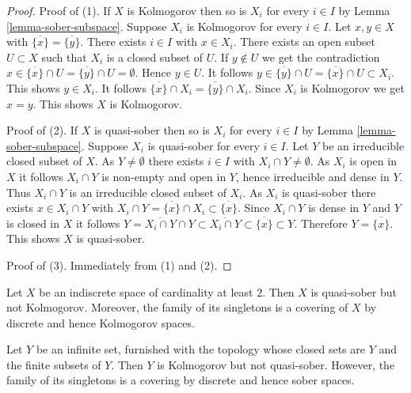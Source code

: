 \begin{proof}
Proof of (1). If $X$ is Kolmogorov then so is $X_i$ for every $i\in I$ by
Lemma \ref{lemma-sober-subspace}. Suppose $X_i$ is Kolmogorov for every
$i\in I$. Let $x,y\in X$ with $\overline{\{x\}}=\overline{\{y\}}$. There exists
$i\in I$ with $x\in X_i$. There exists an open subset $U\subset X$ such that
$X_i$ is a closed subset of $U$. If $y\notin U$ we get the contradiction
$x\in\overline{\{x\}}\cap U=\overline{\{y\}}\cap U=\emptyset$. Hence $y\in U$.
It follows $y\in\overline{\{y\}}\cap U=\overline{\{x\}}\cap U\subset X_i$.
This shows $y\in X_i$. It follows
$\overline{\{x\}}\cap X_i=\overline{\{y\}}\cap X_i$. Since $X_i$ is
Kolmogorov we get $x=y$. This shows $X$ is Kolmogorov.

\medskip\noindent
Proof of (2). If $X$ is quasi-sober then so is $X_i$ for every $i\in I$ by
Lemma \ref{lemma-sober-subspace}. Suppose $X_i$ is quasi-sober for every
$i\in I$. Let $Y$ be an irreducible closed subset of $X$. As $Y\neq\emptyset$
there exists $i\in I$ with $X_i\cap Y\neq\emptyset$. As $X_i$ is open in $X$ it
follows $X_i\cap Y$ is non-empty and open in $Y$, hence irreducible
and dense in $Y$. Thus $X_i\cap Y$ is an irreducible closed subset of $X_i$. As
$X_i$ is quasi-sober there exists $x\in X_i\cap Y$ with
$X_i\cap Y=\overline{\{x\}}\cap X_i\subset\overline{\{x\}}$. Since
$X_i\cap Y$ is dense in $Y$ and $Y$ is closed in $X$ it follows
$Y=\overline{X_i\cap Y}\cap Y\subset\overline{X_i\cap Y}\subset
\overline{\{x\}}\subset Y$. Therefore
$Y=\overline{\{x\}}$. This shows $X$ is quasi-sober.

\medskip\noindent
Proof of (3). Immediately from (1) and (2).
\end{proof}

\begin{example}
\label{example-quasi-sober-not-kolmogorov}
Let $X$ be an indiscrete space of cardinality at least $2$. Then $X$ is
quasi-sober but not Kolmogorov. Moreover, the family of its singletons is a
covering of $X$ by discrete and hence Kolmogorov spaces.
\end{example}

\begin{example}
\label{example-kolmogorov-not-quasi-sober}
Let $Y$ be an infinite set, furnished with the topology whose closed sets are
$Y$ and the finite subsets of $Y$. Then $Y$ is Kolmogorov but not quasi-sober.
However, the family of its singletons is
a covering by discrete and hence sober spaces.
\end{example}

